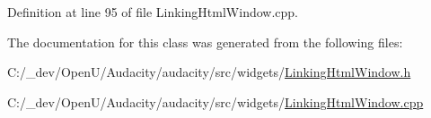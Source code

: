 Definition at line 95 of file Linking\+Html\+Window.\+cpp.



The documentation for this class was generated from the following files\+:\begin{DoxyCompactItemize}
\item 
C\+:/\+\_\+dev/\+Open\+U/\+Audacity/audacity/src/widgets/\hyperlink{_linking_html_window_8h}{Linking\+Html\+Window.\+h}\item 
C\+:/\+\_\+dev/\+Open\+U/\+Audacity/audacity/src/widgets/\hyperlink{_linking_html_window_8cpp}{Linking\+Html\+Window.\+cpp}\end{DoxyCompactItemize}
